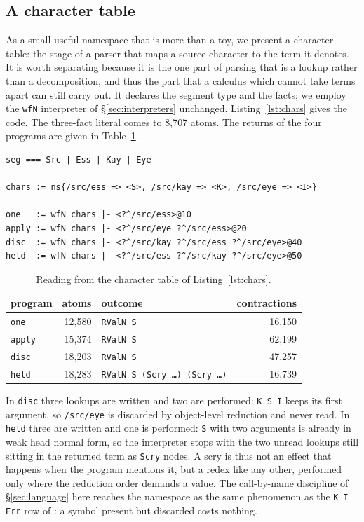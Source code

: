 \documentclass[english,submission,code=tt]{programming}
\begin{document}
\subsection{A character table}\label{sec:chars}

As a small useful namespace that is more than a toy, we present a 
character table: the stage of a parser that maps a source character to 
the term it denotes.  It is worth separating because it is the one part 
of parsing that is a lookup rather than a decomposition, and thus the
part that a calculus which cannot take terms apart can still carry 
out.  It
declares the segment type and the facts; we employ the \texttt{wfN}
interpreter of \S\ref{sec:interpreters} unchanged.
Listing~\ref{lst:chars} gives the code.
The three-fact literal comes to 8{,}707 atoms.  The returns of the four
programs are given in Table~\ref{tab:chars}.

\begin{lstlisting}[label=lst:chars,float=b,
                   caption={A character table as a namespace, and four
                   programs that read from it.}]
seg === Src | Ess | Kay | Eye

chars := ns{/src/ess => <S>, /src/kay => <K>, /src/eye => <I>}

one   := wfN chars |- <?^/src/ess>@10
apply := wfN chars |- <?^/src/eye ?^/src/ess>@20
disc  := wfN chars |- <?^/src/kay ?^/src/ess ?^/src/eye>@40
held  := wfN chars |- <?^/src/ess ?^/src/kay ?^/src/eye>@50
\end{lstlisting}

\begin{table}[tb]
\caption{Reading from the character table of
Listing~\ref{lst:chars}.}\label{tab:chars}
\centering\small
\begin{tabular}{@{}lrlr@{}}
\toprule
program & atoms & outcome & contractions \\
\midrule
\texttt{one}   & 12{,}580 & \texttt{RValN S} & 16{,}150 \\
\texttt{apply} & 15{,}374 & \texttt{RValN S} & 62{,}199 \\
\texttt{disc}  & 18{,}203 & \texttt{RValN S} & 47{,}257 \\
\texttt{held}  & 18{,}283 & \texttt{RValN S (Scry \ldots) (Scry \ldots)} & 16{,}739 \\
\bottomrule
\end{tabular}
\end{table}

In \texttt{disc} three lookups are written and two are performed:
\texttt{K\,S\,I} keeps its first argument, so \texttt{/src/eye} is
discarded by object-level reduction and never read.  In \texttt{held}
three are written and one is performed: \texttt{S} with two arguments
is already in weak head normal form, so the interpreter stops with the
two unread lookups still sitting in the returned term as
\texttt{Scry} nodes.  A scry is thus not an effect that happens when
the program mentions it, but a redex like any other, performed only
where the reduction order demands a value.  The call-by-name
discipline of \S\ref{sec:language} here reaches the namespace as
the same phenomenon as the \texttt{K\,I\,Err} row of
\citet{Davis2027}: a symbol present but discarded costs nothing.
\end{document}
